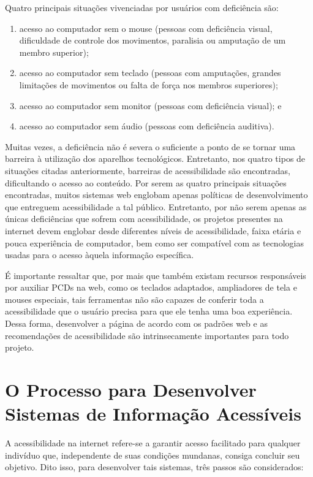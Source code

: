 \documentclass[
  12pt,
  openright,
  twoside,
  a4paper,
  english,
  french,
  spanish,
  brazil
]{abntex2}
\begin{document}
Quatro principais situações vivenciadas por usuários com deficiência são:

\begin{enumerate}
  \item
    acesso ao computador sem o mouse (pessoas com deficiência visual,
    dificuldade de controle dos movimentos, paralisia ou amputação de um membro
    superior);
  \item
    acesso ao computador sem teclado (pessoas com amputações, grandes limitações
    de movimentos ou falta de força nos membros superiores);
  \item acesso ao computador sem monitor (pessoas com deficiência visual); e
  \item acesso ao computador sem áudio (pessoas com deficiência auditiva).
\end{enumerate}

Muitas vezes, a deficiência não é severa o suficiente a ponto de se tornar uma
barreira à utilização dos aparelhos tecnológicos. Entretanto, nos quatro tipos
de situações citadas anteriormente, barreiras de acessibilidade são encontradas,
dificultando o acesso ao conteúdo. Por serem as quatro principais situações
encontradas, muitos sistemas web englobam apenas políticas de desenvolvimento
que entreguem acessibilidade a tal público. Entretanto, por não serem apenas as
únicas deficiências que sofrem com acessibilidade, os projetos presentes na
internet devem englobar desde diferentes níveis de acessibilidade, faixa etária
e pouca experiência de computador, bem como ser compatível com as tecnologias
usadas para o acesso àquela informação específica.

É importante ressaltar que, por mais que também existam recursos responsáveis
por auxiliar PCDs na web, como os teclados adaptados, ampliadores de tela e
mouses especiais, tais ferramentas não são capazes de conferir toda a
acessibilidade que o usuário precisa para que ele tenha uma boa experiência.
Dessa forma, desenvolver a página de acordo com os padrões web e as
recomendações de acessibilidade são intrinsecamente importantes para todo
projeto.

\section{O Processo para Desenvolver Sistemas de Informação Acessíveis}

A acessibilidade na internet refere-se a garantir acesso facilitado para
qualquer indivíduo que, independente de suas condições mundanas, consiga
concluir seu objetivo. Dito isso, para desenvolver tais sistemas, três passos
são considerados:
\end{document}
